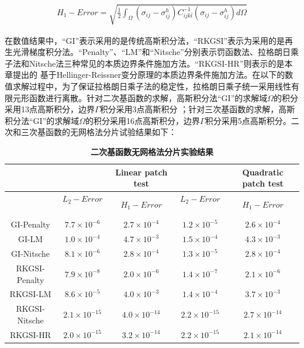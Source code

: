 \begin{equation}
    \begin{split}
        H_1-Error=\sqrt{\frac{1}{2}\int_{\Omega}(\sigma_{ij}-\sigma_{ij}^h)C_{ijkl}^{-1}(\sigma_{ij}-\sigma_{ij}^h)d\Omega}
    \end{split}
    \end{equation}\par
在数值结果中，“GI”表示采用的是传统高斯积分法，“RKGSI”表示为采用的是再生光滑梯度积分法。“Penalty”、“LM”和“Nitsche”分别表示罚函数法、拉格朗日乘子法和Nitsche法三种常见的本质边界条件施加方法。“RKGSI-HR”则表示的是本章提出的
基于Hellinger-Reissner变分原理的本质边界条件施加方法。在以下的数值求解过程中，为了保证拉格朗日乘子法的稳定性，拉格朗日乘子统一采用线性有限元形函数进行离散。针对二次基函数的求解，高斯积分法“GI”的求解域$\Omega$的积分采用13点高斯积分，边界$\Gamma$积分采用3点高斯积分
；针对三次基函数的求解，高斯积分法“GI”的求解域$\Omega$的积分采用16点高斯积分，边界$\Gamma$积分采用5点高斯积分。二次和三次基函数的无网格法分片试验结果如下：\par
\begin{table}[h]
    \caption{\textbf{二次基函数无网格法分片实验结果}}
    \centering
   \begin{tabular}{ccccc}
   \toprule
   &$\quad$ &Linear patch test &$\quad$ &Quadratic patch test\\
   \midrule
   &$L_2-Error$$\quad$&$H_1-Error$&$L_2-Error$$\quad$&$H_1-Error$\\
   \midrule
   GI-Penalty&$7.7\times10^{-6}$&$2.7\times10^{-4}$&$1.2\times10^{-5}$&$2.6\times10^{-4}$\\
   GI-LM&$1.0\times10^{-4}$&$4.7\times10^{-3}$&$1.5\times10^{-4}$&$4.3\times10^{-3}$\\
   GI-Nitsche&$8.1\times10^{-6}$&$2.8\times10^{-4}$&$1.3\times10^{-5}$&$2.8\times10^{-4}$\\
  RKGSI-Penalty&$7.9\times10^{-8}$&$2.0\times10^{-6}$&$1.4\times10^{-7}$&$2.1\times10^{-6}$\\
  RKGSI-LM&$8.6\times10^{-5}$&$4.0\times10^{-3}$&$1.4\times10^{-4}$&$3.7\times10^{-3}$\\
  RKGSI-Nitsche&$2.1\times10^{-15}$&$4.0\times10^{-14}$&$2.2\times10^{-15}$&$2.7\times10^{-14}$\\
  RKGSI-HR&$2.0\times10^{-15}$&$3.2\times10^{-14}$&$2.2\times10^{-15}$&$2.1\times10^{-14}$\\
   \bottomrule
   \end{tabular}
   \end{table}
